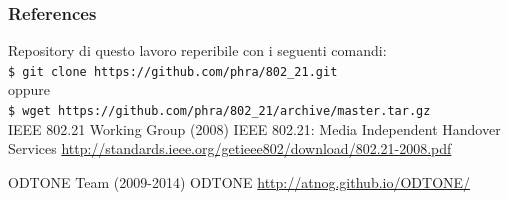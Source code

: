 \documentclass[10pt]{beamer}
\newcommand{\cmduser}[1]{\\\texttt{\$ #1}\\}
\begin{document}
\begin{frame}
\frametitle{References}
\footnotesize{
\begin{thebibliography}{99} %

 Repository di questo lavoro reperibile con i seguenti comandi:
\newblock \cmduser{git clone https://github.com/phra/802\_21.git}
oppure
\cmduser{wget https://github.com/phra/802\_21/archive/master.tar.gz}
\vspace{2em}
 IEEE 802.21 Working Group (2008)
\newblock IEEE 802.21: Media Independent Handover Services
\newblock \url{http://standards.ieee.org/getieee802/download/802.21-2008.pdf}

 ODTONE Team (2009-2014)
\newblock ODTONE
\newblock \url{http://atnog.github.io/ODTONE/}


\end{thebibliography}
}
\end{frame}
\end{document}
